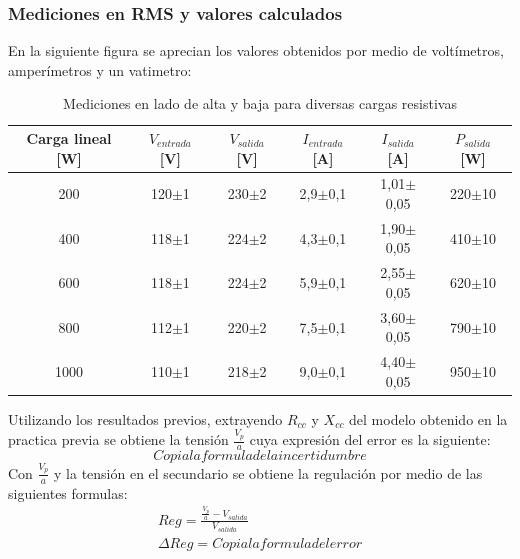 \documentclass[11pt,letterpaper]{article}     %
\begin{document}
\subsubsection{Mediciones en RMS y valores calculados}
En la siguiente figura se aprecian los valores obtenidos por medio de  voltímetros, amperímetros y un vatimetro:
\begin{table}[H]
\centering
\caption{Mediciones en lado de alta y baja para diversas cargas resistivas}
\label{experiencia1}
\begin{tabular}{|c|c|c|c|c|c|}
\hline
\textbf{Carga lineal {[}W{]}} & \textbf{$V_{entrada}$ {[}V{]}} & \textbf{$V_{salida}$ {[}V{]}} & \textbf{$I_{entrada}$ {[}A{]}} & \textbf{$I_{salida}$ {[}A{]}} & \textbf{$P_{salida}$ {[}W{]}} \\ \hline
200                           & 120$\pm$1                      & 230$\pm$2                     & 2,9$\pm$0,1                    & 1,01$\pm$0,05                 & 220$\pm$10                    \\ \hline
400                           & 118$\pm$1                      & 224$\pm$2                     & 4,3$\pm$0,1                    & 1,90$\pm$0,05                 & 410$\pm$10                    \\ \hline
600                           & 118$\pm$1                      & 224$\pm$2                     & 5,9$\pm$0,1                    & 2,55$\pm$0,05                 & 620$\pm$10                    \\ \hline
800                           & 112$\pm$1                      & 220$\pm$2                     & 7,5$\pm$0,1                    & 3,60$\pm$0,05                 & 790$\pm$10                    \\ \hline
1000                          & 110$\pm$1                      & 218$\pm$2                     & 9,0$\pm$0,1                    & 4,40$\pm$0,05                 & 950$\pm$10                    \\ \hline
\end{tabular}
\end{table}
Utilizando los resultados previos, extrayendo $R_{cc}$ y $X_{cc}$ del modelo obtenido en la practica previa se obtiene la tensión $\frac{V_{p}}{a}$ cuya expresión del error es la siguiente:
\begin{equation}
    Copia la formula de la incertidumbre
\end{equation}
Con $\frac{V_{p}}{a}$ y la tensión en el secundario se obtiene la regulación por medio de las siguientes formulas:
\begin{align}
    Reg = \frac{\frac{V_{p}}{a}-V_{salida}}{V_{salida}}\\
    \Delta Reg = Copia la formula del error
\end{align}
\end{document}
